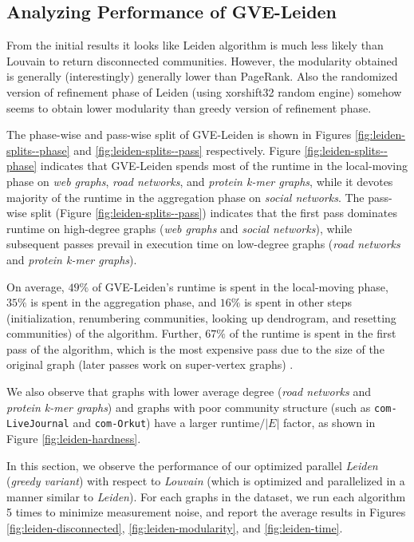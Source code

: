 






\subsection{Analyzing Performance of GVE-Leiden}

From the initial results it looks like Leiden algorithm is much less likely than Louvain to return disconnected communities. However, the modularity obtained is generally (interestingly) generally lower than PageRank. Also the randomized version of refinement phase of Leiden (using xorshift32 random engine) somehow seems to obtain lower modularity than greedy version of refinement phase.

The phase-wise and pass-wise split of GVE-Leiden is shown in Figures \ref{fig:leiden-splits--phase} and \ref{fig:leiden-splits--pass} respectively. Figure \ref{fig:leiden-splits--phase} indicates that GVE-Leiden spends most of the runtime in the local-moving phase on \textit{web graphs}, \textit{road networks}, and \textit{protein k-mer graphs}, while it devotes majority of the runtime in the aggregation phase on \textit{social networks}. The pass-wise split (Figure \ref{fig:leiden-splits--pass}) indicates that the first pass dominates runtime on high-degree graphs (\textit{web graphs} and \textit{social networks}), while subsequent passes prevail in execution time on low-degree graphs (\textit{road networks} and \textit{protein k-mer graphs}).

On average, $49\%$ of GVE-Leiden's runtime is spent in the local-moving phase, $35\%$ is spent in the aggregation phase, and $16\%$ is spent in other steps (initialization, renumbering communities, looking up dendrogram, and resetting communities) of the algorithm. Further, $67\%$ of the runtime is spent in the first pass of the algorithm, which is the most expensive pass due to the size of the original graph (later passes work on super-vertex graphs) \cite{com-wickramaarachchi14}.

We also observe that graphs with lower average degree (\textit{road networks} and \textit{protein k-mer graphs}) and graphs with poor community structure (such as \verb|com-LiveJournal| and \verb|com-Orkut|) have a larger $\text{runtime}/|E|$ factor, as shown in Figure \ref{fig:leiden-hardness}.


In this section, we observe the performance of our optimized parallel \textit{Leiden} (\textit{greedy variant}) with respect to \textit{Louvain} (which is optimized and parallelized in a manner similar to \textit{Leiden}). For each graphs in the dataset, we run each algorithm 5 times to minimize measurement noise, and report the average results in Figures \ref{fig:leiden-disconnected}, \ref{fig:leiden-modularity}, and \ref{fig:leiden-time}.

